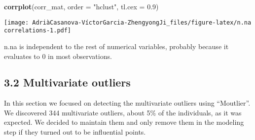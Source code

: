\documentclass[
]{article}
\newenvironment{Shaded}{\begin{snugshade}}{\end{snugshade}}
\newcommand{\AttributeTok}[1]{\textcolor[rgb]{0.13,0.29,0.53}{#1}}
\newcommand{\FloatTok}[1]{\textcolor[rgb]{0.00,0.00,0.81}{#1}}
\newcommand{\FunctionTok}[1]{\textcolor[rgb]{0.13,0.29,0.53}{\textbf{#1}}}
\newcommand{\NormalTok}[1]{#1}
\newcommand{\StringTok}[1]{\textcolor[rgb]{0.31,0.60,0.02}{#1}}
\begin{document}
\begin{Shaded}
\begin{Highlighting}[]
\FunctionTok{corrplot}\NormalTok{(corr\_mat, }\AttributeTok{order =} \StringTok{"hclust"}\NormalTok{, }\AttributeTok{tl.cex =} \FloatTok{0.9}\NormalTok{)}
\end{Highlighting}
\end{Shaded}

\texttt{[image: AdriàCasanova-VíctorGarcia-ZhengyongJi\_files/figure-latex/n.na correlations-1.pdf]}

n.na is independent to the rest of numerical variables, probably because
it evaluates to 0 in most observations.

\hypertarget{multivariate-outliers}{%
\subsection{3.2 Multivariate outliers}\label{multivariate-outliers}}

In this section we focused on detecting the multivariate outliers using
``Moutlier''. We discovered 344 multivariate outliers, about 5\% of the
individuals, as it was expected. We decided to maintain them and only
remove them in the modeling step if they turned out to be influential
points.
\end{document}
